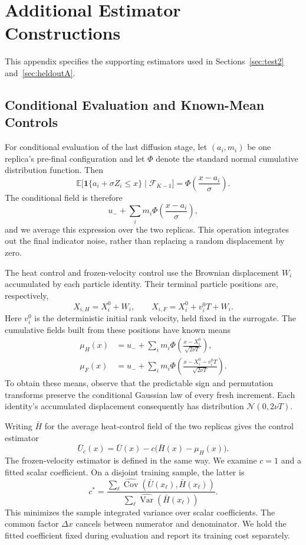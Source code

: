 \documentclass[smallextended,nospthms]{svjour3}
\theoremstyle{plain}
\theoremstyle{definition}
\theoremstyle{remark}
\numberwithin{equation}{section}
\newcommand{\E}{\mathbb{E}}
\newcommand{\Var}{\operatorname{Var}}
\newcommand{\ind}{\mathbf{1}}
\newcommand{\Fil}{\mathcal{F}}
\begin{document}
\section{Additional Estimator Constructions}
\label{app:comparators}

This appendix specifies the supporting estimators used in
Sections~\ref{sec:test2} and~\ref{sec:heldoutA}.

\subsection{Conditional Evaluation and Known-Mean Controls}

For conditional evaluation of the last diffusion stage, let $(a_i,m_i)$ be
one replica's pre-final configuration and let $\Phi$ denote the standard
normal cumulative distribution function. Then
\[
 \E\bigl[\ind\{a_i+\sigma Z_i\le x\}\mid\Fil_{K-1}\bigr]
 =\Phi\!\left(\frac{x-a_i}{\sigma}\right).
\]
The conditional field is therefore
\[
 u_-+\sum_i m_i\Phi\!\left(\frac{x-a_i}{\sigma}\right),
\]
and we average this expression over the two replicas. This operation
integrates out the final indicator noise, rather than replacing a random
displacement by zero.

The heat control and frozen-velocity control use the Brownian displacement
$W_i$ accumulated by each particle identity. Their terminal particle
positions are, respectively,
\[
 X_{i,H}=X_i^0+W_i,\qquad
 X_{i,F}=X_i^0+v_i^0T+W_i.
\]
Here $v_i^0$ is the deterministic initial rank velocity, held fixed in the
surrogate. The cumulative fields built from these positions have known means
\[
 \begin{aligned}
 \mu_H(x)&=u_-+\sum_i m_i\Phi\!\left(\frac{x-X_i^0}{\sqrt{2\nu T}}\right),\\
 \mu_F(x)&=u_-+\sum_i m_i\Phi\!\left(\frac{x-X_i^0-v_i^0T}{\sqrt{2\nu T}}\right).
 \end{aligned}
\]
To obtain these means, observe that the predictable sign and permutation
transforms preserve the conditional Gaussian law of every fresh increment.
Each identity's accumulated displacement consequently has distribution
$\mathcal N(0,2\nu T)$.

Writing $\bar H$ for the average heat-control field of the two replicas gives
the control estimator
\[
 \bar U_c(x)=\bar U(x)-c\bigl(\bar H(x)-\mu_H(x)\bigr).
\]
The frozen-velocity estimator is defined in the same way. We examine $c=1$
and a fitted scalar coefficient. On a disjoint training sample, the latter is
\[
 c^*=\frac{\sum_\ell\widehat{\operatorname{Cov}}
       (\bar U(x_\ell),\bar H(x_\ell))}
      {\sum_\ell\widehat{\Var}(\bar H(x_\ell))}.
\]
This minimizes the sample integrated variance over scalar coefficients.
The common factor $\Delta x$ cancels between numerator and denominator.
We hold the fitted coefficient fixed during evaluation and report its
training cost separately.
\end{document}
